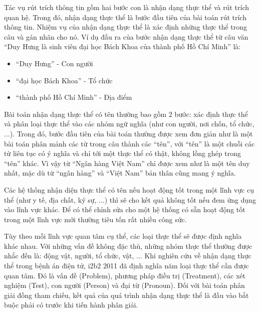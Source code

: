 Tác vụ rút trích thông tin gồm hai bước con là nhận dạng thực thể và rút trích quan hệ. Trong đó, nhận dạng thực thể là bước đầu tiên của bài toán rút trích thông tin. Nhiệm vụ của nhận dạng thực thể là xác định những thực thể trong câu và gán nhãn cho nó. Ví dụ đầu ra của bước nhận dạng thực thể từ câu văn ``Duy Hưng là sinh viên đại học Bách Khoa của thành phố Hồ Chí Minh'' là:

\begin{itemize}[noitemsep]
\item ``Duy Hưng'' - Con người
\item ``đại học Bách Khoa'' - Tổ chức
\item ``thành phố Hồ Chí Minh'' - Địa điểm
\end{itemize}

Bài toán nhận dạng thực thể có tên thường bao gồm 2 bước: xác định thực thể và phân loại thực thể vào các nhóm ngữ nghĩa (như con người, nơi chốn, tổ chức, ...). Trong đó, bước đầu tiên của bài toán thường được xem đơn giản như là một bài toán phân mảnh các từ trong câu thành các ``tên'', với ``tên'' là một chuỗi các từ liên tục có ý nghĩa và chỉ tới một thực thể có thật, không lồng ghép trong ``tên'' khác. Vì vậy từ ``Ngân hàng Việt Nam'' chỉ được xem như là một tên duy nhất, mặc dù từ ``ngân hàng'' và ``Việt Nam'' bản thân cũng mang ý nghĩa.

Các hệ thống nhận diện thực thể có tên nếu hoạt động tốt trong một lĩnh vực cụ thể (như y tế, địa chất, ký sự, ...) thì sẽ cho kết quả không tốt nếu đem ứng dụng vào lĩnh vực khác. Để có thể chỉnh sửa cho một hệ thống có sẵn hoạt động tốt trong một lĩnh vực mới thường tiêu tốn rất nhiều công sức.

Tùy theo mỗi lĩnh vực quan tâm cụ thể, các loại thực thể sẽ được định nghĩa khác nhau. Với những vấn đề không đặc thù, những nhóm thực thể thường được nhắc đến là: động vật, người, tổ chức, vật, ... Khi nghiên cứu về nhận dạng thực thể trong bệnh án điện tử, i2b2 2011 đã định nghĩa năm loại thực thể cần được quan tâm. Đó là vấn đề (Problem), phương pháp điều trị (Treatment), các xét nghiệm (Test), con người (Person) và đại từ (Pronoun). Đối với bài toán phân giải đồng tham chiếu, kết quả của quá trình nhận dạng thực thể là đầu vào bắt buộc phải có trước khi tiến hành phân giải.